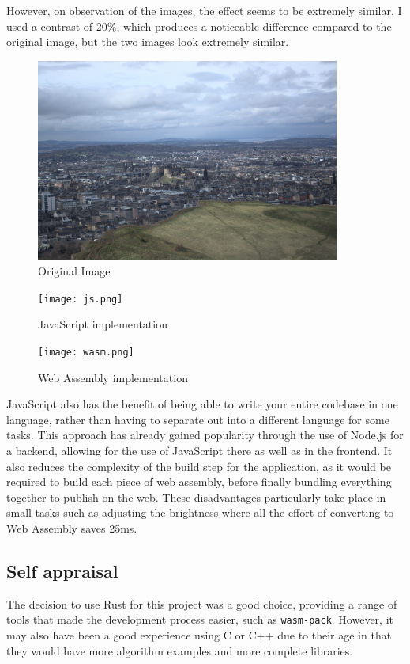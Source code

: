 \documentclass[12pt,a4paper]{article}
\begin{document}
However, on observation of the images, the effect seems to be extremely similar, I used a contrast of 20\%, which produces a noticeable difference compared to the original image, but the two images look extremely similar.

\begin{figure}[H]
    \centering
    \includegraphics[width=10cm]{no_blur.png}
    \caption{Original Image}
\end{figure}
\begin{figure}[H]
    \centering
    \texttt{[image: js.png]}
    \caption{JavaScript implementation}
\end{figure}
\begin{figure}[H]
    \centering
    \texttt{[image: wasm.png]}
    \caption{Web Assembly implementation}
\end{figure}


JavaScript also has the benefit of being able to write your entire codebase in one language, rather than having to separate out into a different language for some tasks. This approach has already gained popularity through the use of Node.js for a backend, allowing for the use of JavaScript there as well as in the frontend. It also reduces the complexity of the build step for the application, as it would be required to build each piece of web assembly, before finally bundling everything together to publish on the web. These disadvantages particularly take place in small tasks such as adjusting the brightness where all the effort of converting to Web Assembly saves 25ms.

\subsection{Self appraisal}

The decision to use Rust for this project was a good choice, providing a range of tools that made the development process easier, such as \texttt{wasm-pack}. However, it may also have been a good experience using C or C++ due to their age in that they would have more algorithm examples and more complete libraries.
\end{document}
